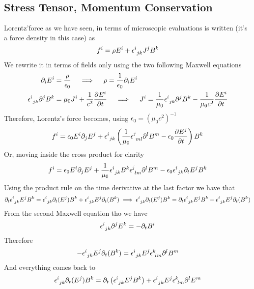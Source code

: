 \documentclass[../electromagnetism]{subfiles}
\begin{document}
\subsection{Stress Tensor, Momentum Conservation}
Lorentz'force as we have seen, in terms of microscopic evaluations is written (it's a force density in this case) as
\begin{equation}
	f^i=\rho E^i+\epsilon^{i}_{\ jk}J^jB^k
	\label{eq:lorentzforcedensity}
\end{equation}
We rewrite it in terms of fields only using the two following Maxwell equations
\begin{equation}
	\begin{aligned}
		\partial_iE^i&=\frac{\rho}{\epsilon_0}\quad\implies\quad\rho=\frac{1}{\epsilon_0}\partial_iE^i\\
		\epsilon^{i}_{\ jk}\partial^jB^k&=\mu_0J^i+\frac{1}{c^2}\pdv{E^i}{t}\quad\implies\quad J^i=\frac{1}{\mu_0}\epsilon^{i}_{\ jk}\partial^jB^k-\frac{1}{\mu_0c^2}\pdv{E^i}{t}
	\end{aligned}
	\label{eq:currentandchargeasfields}
\end{equation}
Therefore, Lorentz's force becomes, using $\epsilon_0=(\mu_0c^2)^{-1}$
\begin{equation*}
	f^i=\epsilon_0E^i\partial_jE^j+\epsilon^{i}_{\ jk}\left( \frac{1}{\mu_0}\epsilon^{j}_{\ ml}\partial^lB^m-\epsilon_0\pdv{E^j}{t} \right)B^k
\end{equation*}
Or, moving inside the cross product for clarity
\begin{equation*}
	f^i=\epsilon_0E^i\partial_jE^j+\frac{1}{\mu_0}\epsilon^{i}_{\ jk}B^k\epsilon^{j}_{\ lm}\partial^lB^m-\epsilon_0\epsilon^{i}_{\ jk}\partial_t{E^j}B^k
\end{equation*}
Using the product rule on the time derivative at the last factor we have that
\begin{equation*}
	\partial_t\epsilon^{i}_{\ jk}E^jB^k=\epsilon^{i}_{\ jk}\partial_t(E^j)B^k+\epsilon^{i}_{\ jk}E^j\partial_t(B^k)\implies\epsilon^{i}_{\ jk}\partial_t(E^j)B^k=\partial_t\epsilon^{i}_{\ jk}E^jB^k-\epsilon^{i}_{\ jk}E^j\partial_t(B^k)
\end{equation*}
From the second Maxwell equation tho we have
\begin{equation*}
	\epsilon^{i}_{\ jk}\partial^jE^k=-\partial_tB^i
\end{equation*}
Therefore
\begin{equation*}
	-\epsilon^{i}_{\ jk}E^j\partial_t(B^k)=\epsilon^{i}_{\ jk}E^j\epsilon^{k}_{\ lm}\partial^lB^m
\end{equation*}
And everything comes back to
\begin{equation*}
	\epsilon^{i}_{\ jk}\partial_t(E^j)B^k=\partial_t\left( \epsilon^{i}_{\ jk}E^jB^k \right)+\epsilon^{i}_{\ jk}E^j\epsilon^{k}_{\ lm}\partial^lE^m
\end{equation*}
\end{document}
